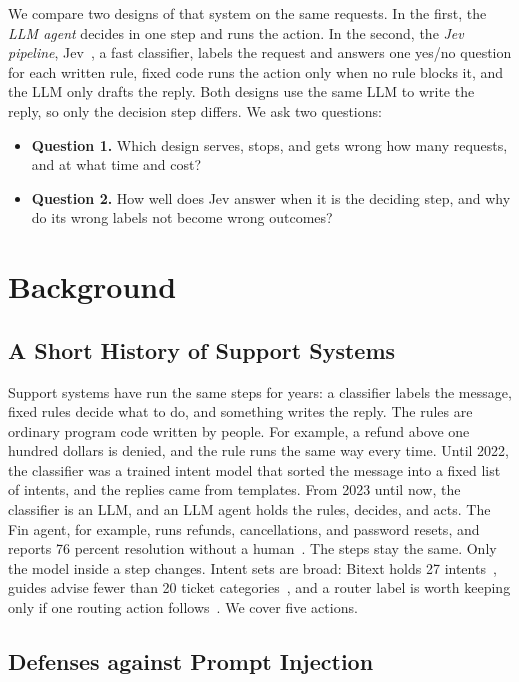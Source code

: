 \documentclass[sigconf,nonacm]{acmart}
\begin{document}
We compare two designs of that system on the same requests. In the first, the \emph{LLM agent} decides in one step and runs the action. In the second, the \emph{Jev pipeline}, Jev~\cite{almeida2026jev}, a fast classifier, labels the request and answers one yes/no question for each written rule, fixed code runs the action only when no rule blocks it, and the LLM only drafts the reply. Both designs use the same LLM to write the reply, so only the decision step differs. We ask two questions:
\begin{itemize}
    \item \textbf{Question 1.} Which design serves, stops, and gets wrong how many requests, and at what time and cost?
    \item \textbf{Question 2.} How well does Jev answer when it is the deciding step, and why do its wrong labels not become wrong outcomes?
\end{itemize}

\section{Background}\label{sec:related}

\subsection{A Short History of Support Systems}

Support systems have run the same steps for years: a classifier labels the message, fixed rules decide what to do, and something writes the reply. The rules are ordinary program code written by people. For example, a refund above one hundred dollars is denied, and the rule runs the same way every time. Until 2022, the classifier was a trained intent model that sorted the message into a fixed list of intents, and the replies came from templates. From 2023 until now, the classifier is an LLM, and an LLM agent holds the rules, decides, and acts. The Fin agent, for example, runs refunds, cancellations, and password resets, and reports 76 percent resolution without a human~\cite{intercom2026fin}. The steps stay the same. Only the model inside a step changes. Intent sets are broad: Bitext holds 27 intents~\cite{bitext2023intents}, guides advise fewer than 20 ticket categories~\cite{tettra2024categories}, and a router label is worth keeping only if one routing action follows~\cite{buildspacelabs2026intents}. We cover five actions.

\subsection{Defenses against Prompt Injection}
\end{document}
